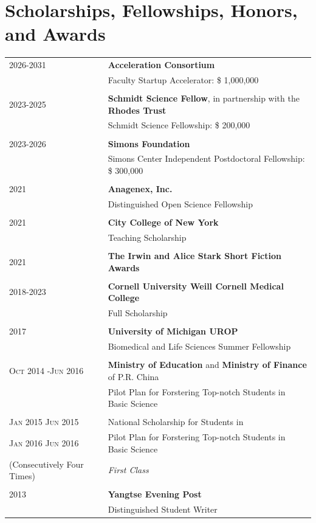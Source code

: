 \section{Scholarships, Fellowships, Honors, and Awards}
\begin{longtable}{p{} p{} }
2026-2031 & \textbf{Acceleration Consortium} \\
& Faculty Startup Accelerator: \$ 1,000,000 \\\\


2023-2025 & \textbf{Schmidt Science Fellow}, in partnership with the \textbf{Rhodes Trust} \\
& Schmidt Science Fellowship: \$ 200,000\\\\

2023-2026 & \textbf{Simons Foundation}\\
& Simons Center Independent Postdoctoral Fellowship: \$ 300,000 \\\\

2021 & \textbf{Anagenex, Inc.}\\
& Distinguished Open Science Fellowship \\\\

2021 & \textbf{City College of New York}\\
& Teaching Scholarship \\\\

2021 & \textbf{The Irwin and Alice Stark Short Fiction Awards}\\\\

2018-2023 & \textbf{Cornell University Weill Cornell Medical College}\\
     & Full Scholarship \\\\

\textsc{2017} & \textbf{University of Michigan UROP} \\ &  Biomedical and Life Sciences Summer Fellowship\\\\

\textsc{Oct 2014 -Jun 2016} & \textbf{Ministry of Education} and  \textbf{Ministry of Finance} of P.R. China \\ &Pilot Plan for Forstering Top-notch Students in Basic Science \\\\
 \textsc{Jan} 2015 \textsc{Jun} 2015 & National Scholarship for Students in \\ \textsc{Jan} 2016 \textsc{Jun} 2016 & Pilot Plan for Forstering Top-notch Students in Basic Science \\ \footnotesize(Consecutively Four Times) & \emph{First Class}\\\\
 \textsc 2013 &\textbf{Yangtse Evening Post} \\& Distinguished Student Writer\\
\end{longtable}



